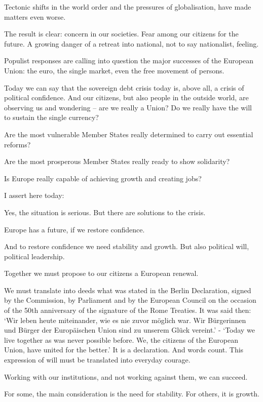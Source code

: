 \documentclass[a4paper,11pt]{article}
\begin{document}
Tectonic shifts in the world order and the pressures of globalisation, have made matters even worse.

The result is clear: concern in our societies. Fear among our citizens for the future. A growing danger of a retreat into national, not to say nationalist, feeling.

Populist responses are calling into question the major successes of the European Union: the euro, the single market, even the free movement of persons.

Today we can say that the sovereign debt crisis today is, above all, a crisis of political confidence. And our citizens, but also people in the outside world, are observing us and wondering – are we really a Union? Do we really have the will to sustain the single currency?

Are the most vulnerable Member States really determined to carry out essential reforms?

Are the most prosperous Member States really ready to show solidarity?

Is Europe really capable of achieving growth and creating jobs?

I assert here today:

Yes, the situation is serious. But there are solutions to the crisis.

Europe has a future, if we restore confidence.

And to restore confidence we need stability and growth. But also political will, political leadership.

Together we must propose to our citizens a European renewal.

We must translate into deeds what was stated in the Berlin Declaration, signed by the Commission, by Parliament and by the European Council on the occasion of the 50th anniversary of the signature of the Rome Treaties. It was said then: ‘Wir leben heute miteinander, wie es nie zuvor möglich war. Wir Bürgerinnen und Bürger der Europäischen Union sind zu unserem Glück vereint.' - ‘Today we live together as was never possible before. We, the citizens of the European Union, have united for the better.' It is a declaration. And words count. This expression of will must be translated into everyday courage.

Working with our institutions, and not working against them, we can succeed.

For some, the main consideration is the need for stability. For others, it is growth.
\end{document}
